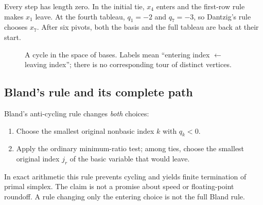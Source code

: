 \documentclass[11pt,a4paper]{article}
\begin{document}
Every step has length zero. In the initial tie, $x_4$ enters and the
first-row rule makes $x_1$ leave. At the fourth tableau,
$q_1=-2$ and $q_7=-3$, so Dantzig's rule chooses $x_7$.
After six pivots, both the basis and the full tableau are back at their start.

\begin{figure}[H]
  \centering
  \caption{A cycle in the space of bases. Labels mean ``entering index $\gets$
    leaving index''; there is no corresponding tour of distinct vertices.}
\end{figure}

\subsection{Bland's rule and its complete path}\label{sec:bland}
\begin{lecturecore}
  Bland's anti-cycling rule changes \emph{both} choices:
  \begin{enumerate}[leftmargin=*,itemsep=2pt]
    \item Choose the smallest original nonbasic index $k$ with $q_k<0$.
    \item Apply the ordinary minimum-ratio test; among ties, choose the smallest
          original index $j_r$ of the basic variable that would leave.
  \end{enumerate}
\end{lecturecore}
In exact arithmetic this rule prevents cycling and yields finite termination
of primal simplex. The claim is not a promise about speed or floating-point
roundoff. A rule changing only the entering choice is not the full Bland rule.
\end{document}
